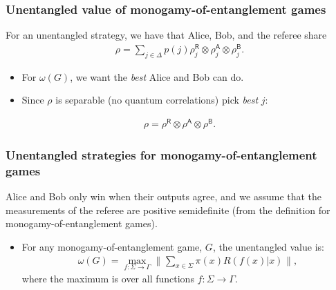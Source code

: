 \documentclass{beamer}
\newcommand{\tinyspace}{\mspace{1mu}}
\newcommand{\biggnorm}[1]{\biggl\lVert\tinyspace #1 \tinyspace\biggr\rVert}
\newcommand{\reg}[1]{\mathsf{#1}}
\begin{document}
\begin{frame}
	\frametitle{Unentangled value of monogamy-of-entanglement games}
	For an unentangled strategy, we have that Alice, Bob, and the referee share
	\begin{align*}
		\rho = \sum_{j \in \Delta} p(j) \rho_j^{\reg{R}} \otimes \rho_j^{\reg{A}} \otimes \rho_j^{\reg{B}}.
	\end{align*}
	\begin{itemize}
		\item For $\omega(G)$, we want the \emph{best} Alice and Bob can do. 
		\item Since $\rho$ is separable (no quantum correlations) pick \emph{best} $j$:
	\end{itemize}
	\begin{align*}
		\rho = \rho^{\reg{R}} \otimes \rho^{\reg{A}} \otimes \rho^{\reg{B}}.
	\end{align*}
\end{frame}

\begin{frame}
	\frametitle{Unentangled strategies for monogamy-of-entanglement games}
Alice and Bob only win when their outputs agree, and we assume that the measurements of the referee are positive semidefinite (from the definition for monogamy-of-entanglement games). 	
	\begin{itemize}
	\item For any monogamy-of-entanglement game, $G$, the unentangled value is:
	\begin{align*}
		\omega(G) = \max_{f: \Sigma \rightarrow \Gamma} \biggnorm{\sum_{x \in \Sigma} \pi(x) R(f(x)|x) },
	\end{align*}	
	where the maximum is over all functions $f : \Sigma \rightarrow \Gamma$.
	\end{itemize}  
\end{frame}
\end{document}
